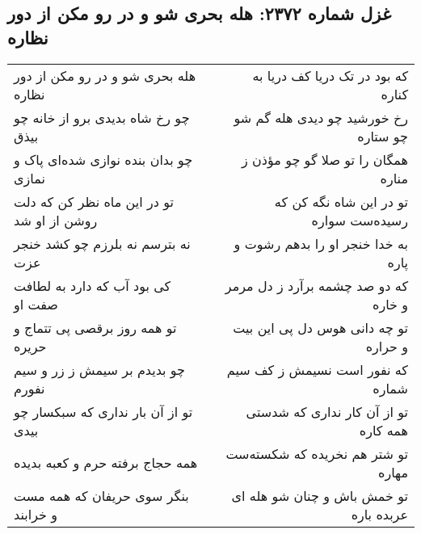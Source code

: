 \begin{center}
\section*{غزل شماره ۲۳۷۲: هله بحری شو و در رو مکن از دور نظاره}
\label{sec:2372}
\begin{longtable}{l p{0.5cm} r}
هله بحری شو و در رو مکن از دور نظاره
&&
که بود در تک دریا کف دریا به کناره
\\
چو رخ شاه بدیدی برو از خانه چو بیذق
&&
رخ خورشید چو دیدی هله گم شو چو ستاره
\\
چو بدان بنده نوازی شده‌ای پاک و نمازی
&&
همگان را تو صلا گو چو مؤذن ز مناره
\\
تو در این ماه نظر کن که دلت روشن از او شد
&&
تو در این شاه نگه کن که رسیده‌ست سواره
\\
نه بترسم نه بلرزم چو کشد خنجر عزت
&&
به خدا خنجر او را بدهم رشوت و پاره
\\
کی بود آب که دارد به لطافت صفت او
&&
که دو صد چشمه برآرد ز دل مرمر و خاره
\\
تو همه روز برقصی پی تتماج و حریره
&&
تو چه دانی هوس دل پی این بیت و حراره
\\
چو بدیدم بر سیمش ز زر و سیم نفورم
&&
که نفور است نسیمش ز کف سیم شماره
\\
تو از آن بار نداری که سبکسار چو بیدی
&&
تو از آن کار نداری که شدستی همه کاره
\\
همه حجاج برفته حرم و کعبه بدیده
&&
تو شتر هم نخریده که شکسته‌ست مهاره
\\
بنگر سوی حریفان که همه مست و خرابند
&&
تو خمش باش و چنان شو هله ای عربده باره
\\
\end{longtable}
\end{center}

